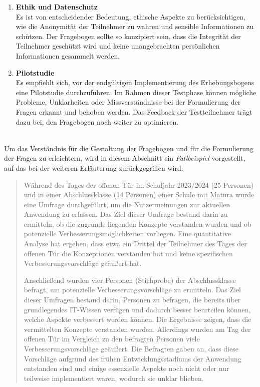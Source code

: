 \begin{enumerate}
    \item \textbf{Ethik und Datenschutz}\\
    Es ist von entscheidender Bedeutung, ethische Aspekte zu berücksichtigen, wie die Anonymität der Teilnehmer zu wahren
    und sensible Informationen zu schützen. Der Fragebogen sollte so konzipiert sein, dass die Integrität der Teilnehmer
    geschützt wird und keine unangebrachten persönlichen Informationen gesammelt werden.

    \item \textbf{Pilotstudie}\\
    Es empfiehlt sich, vor der endgültigen Implementierung des Erhebungsbogens eine Pilotstudie durchzuführen. Im Rahmen
    dieser Testphase können mögliche Probleme, Unklarheiten oder Missverständnisse bei der Formulierung der Fragen erkannt
    und behoben werden. Das Feedback der Testteilnehmer trägt dazu bei, den Fragebogen noch weiter zu optimieren.
\end{enumerate}
\\

Um das Verständnis für die Gestaltung der Fragebögen und für die Formulierung der Fragen zu erleichtern, wird in diesem
Abschnitt ein \textit{Fallbeispiel} vorgestellt, auf das bei der weiteren Erläuterung zurückgegriffen wird.
\begin{quote}
    Während des Tages der offenen Tür im Schuljahr 2023/2024 (25 Personen) und in einer Abschlussklasse (14 Personen)
    einer Schule mit Matura wurde eine Umfrage durchgeführt, um die Nutzermeinungen zur aktuellen Anwendung zu erfassen.
    Das Ziel dieser Umfrage bestand darin zu ermitteln, ob die zugrunde liegenden Konzepte verstanden wurden und ob
    potenzielle Verbesserungsmöglichkeiten vorliegen. Eine quantitative Analyse hat ergeben, dass etwa ein Drittel der
    Teilnehmer des Tages der offenen Tür die Konzeptionen verstanden hat und keine spezifischen Verbesserungsvorschläge
    geäußert hat.

    Anschließend wurden vier Personen (Stichprobe) der Abschlussklasse befragt, um potenzielle Verbesserungsvorschläge
    zu ermitteln. Das Ziel dieser Umfragen bestand darin, Personen zu befragen, die bereits über grundlegendes IT-Wissen
    verfügen und dadurch besser beurteilen können, welche Aspekte verbessert werden können. Die Ergebnisse zeigen, dass
    die vermittelten Konzepte verstanden wurden. Allerdings wurden am Tag der offenen Tür im Vergleich zu den befragten
    Personen viele Verbesserungsvorschläge geäußert. Die Befragten gaben an, dass diese Vorschläge aufgrund des frühen
    Entwicklungsstadiums der Anwendung entstanden sind und einige essenzielle Aspekte noch nicht oder nur teilweise
    implementiert waren, wodurch sie unklar blieben.
\end{quote}
\\

